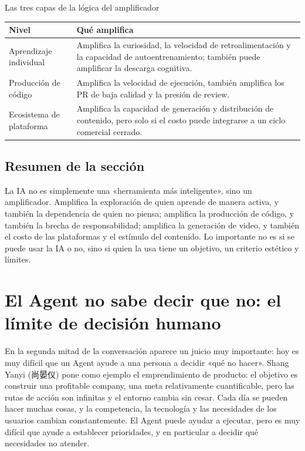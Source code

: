 \documentclass[a4paper]{article}
\begin{document}
\begin{knowledgebox}{Las tres capas de la lógica del amplificador}
\begin{tabularx}{\textwidth}{>{\raggedright\arraybackslash}p{} Y}
\toprule
Nivel & Qué amplifica \\
\midrule
Aprendizaje individual & Amplifica la curiosidad, la velocidad de retroalimentación y la capacidad de autoentrenamiento; también puede amplificar la descarga cognitiva. \\
Producción de código & Amplifica la velocidad de ejecución, también amplifica los PR de baja calidad y la presión de review. \\
Ecosistema de plataforma & Amplifica la capacidad de generación y distribución de contenido, pero solo si el costo puede integrarse a un ciclo comercial cerrado. \\
\bottomrule
\end{tabularx}
\end{knowledgebox}

\subsection{Resumen de la sección}

La IA no es simplemente una «herramienta más inteligente», sino un amplificador. Amplifica la exploración de quien aprende de manera activa, y también la dependencia de quien no piensa; amplifica la producción de código, y también la brecha de responsabilidad; amplifica la generación de video, y también el costo de las plataformas y el estímulo del contenido. Lo importante no es si se puede usar la IA o no, sino si quien la usa tiene un objetivo, un criterio estético y límites.
\section{El Agent no sabe decir que no: el límite de decisión humano}

En la segunda mitad de la conversación aparece un juicio muy importante: hoy es muy difícil que un Agent ayude a una persona a decidir «qué no hacer». Shang Yanyi (尚晏仪) pone como ejemplo el emprendimiento de producto: el objetivo es construir una profitable company, una meta relativamente cuantificable, pero las rutas de acción son infinitas y el entorno cambia sin cesar. Cada día se pueden hacer muchas cosas, y la competencia, la tecnología y las necesidades de los usuarios cambian constantemente. El Agent puede ayudar a ejecutar, pero es muy difícil que ayude a establecer prioridades, y en particular a decidir qué necesidades no atender.
\end{document}
